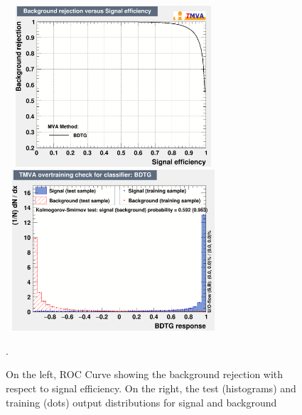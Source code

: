 \documentclass{cernatlasnote}
\begin{document}
\begin{figure}[ht]
\centering
\includegraphics[height=6cm, width=8cm, trim= 0cm 0cm 0cm 0cm,clip]{images/TRKBDT/BDTDaniel_ROC.png}\includegraphics[height=6cm, width=8cm, trim= 0cm 0cm 0cm 0cm,clip]{images/TRKBDT/BDTDaniel_SB.png}
\caption{\label{fig:TRKTraining} On the left, ROC Curve showing the background rejection with respect to signal efficiency. On the right, the test (histograms) and training (dots) output distributions for signal and background}.
\end{figure} 
\end{document}

